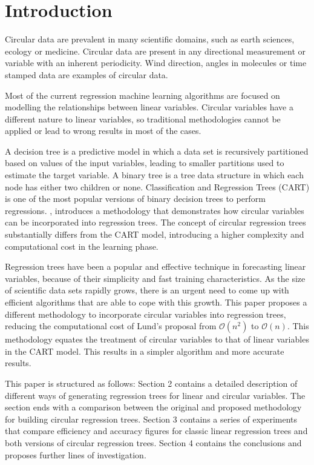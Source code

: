 \documentclass[times,twocolumn,final,authoryear]{elsarticle}
\begin{document}

\section{Introduction}
\label{intro}
Circular data are prevalent in many scientific domains, such as earth sciences, ecology or medicine. Circular data are present in any directional measurement or variable with an inherent periodicity. Wind direction, angles in molecules or time stamped data are examples of circular data.

Most of the current regression machine learning algorithms are focused on modelling the relationships between linear variables. Circular variables have a different nature to linear variables, so traditional methodologies cannot be applied or lead to wrong results in most of the cases.

A decision tree is a predictive model in which a data set is recursively partitioned based on values of the input variables, leading to smaller partitions used to estimate the target variable. A binary tree is a tree data structure in which each node has either two children or none. Classification and Regression Trees (CART) \citep{Breimanetal1984} is one of the most popular versions of binary decision trees to perform regressions. \citep{Lund2002}, introduces a methodology that demonstrates how circular variables can be incorporated into regression trees. The concept of circular regression trees substantially differs from the CART model, introducing a higher complexity and computational cost in the learning phase. 

Regression trees have been a popular and effective technique in forecasting linear variables, because of their simplicity and fast training characteristics. As the size of scientific data sets rapidly grows, there is an urgent need to come up with efficient algorithms that are able to cope with this growth. This paper proposes a different methodology to incorporate circular variables into regression trees, reducing the computational cost of Lund's proposal from $\mathcal{O}(n^2)$ to $\mathcal{O}(n)$. This methodology equates the treatment of circular variables to that of linear variables in the CART model. This results in a simpler algorithm and more accurate results.

This paper is structured as follows: Section 2 contains a detailed description of different ways of generating regression trees for linear and circular variables. The section ends with a comparison between the original and proposed methodology for building circular regression trees. Section 3 contains a series of experiments that compare efficiency and accuracy figures for classic linear regression trees and both versions of circular regression trees. Section 4 contains the conclusions and proposes further lines of investigation.
\end{document}
